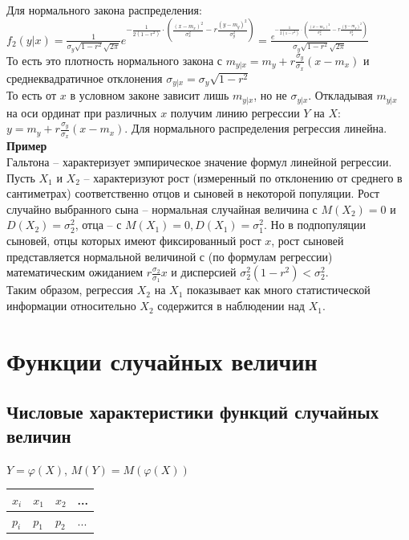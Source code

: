 \documentclass[russian, 12pt, fleqn,x11names]{article}
\begin{document}
\\
Для нормального закона распределения:\\
 $f_2(y|x) = \frac{1}{\sigma_y \sqrt{1 - r^2} \sqrt{2\pi}} \displaystyle{  e^{{-\frac{1}{2(1-r^2)}\cdot \left(\frac{(x-m_x)^2}{\sigma_x^2}  -r \frac{(y-m_y)^2}{\sigma_y^2}\right)}}  	}= \displaystyle{  \frac{  e^{{-\frac{1}{2(1-r^2)}\cdot \left (\frac{(x-m_x)^2}{\sigma_x^2}  -r \frac{(y-m_y)^2}{\sigma_y^2}\right )}} }{\sigma_y \sqrt{1 - r^2} \sqrt{2\pi}}}$\\
То есть это плотность нормального закона с $m_{y|x} = m_y + r \frac{\sigma_y}{\sigma_x} (x - m_x)$  и среднеквадратичное отклонения $\sigma_{y|x} = \sigma_{y} \sqrt{1-r^2}$ \\
То есть от $x$ в условном законе зависит лишь $m_{y|x}$, но не $\sigma_{y|x}$. Откладывая  $m_{y|x}$ на оси ординат при различных $x$ получим линию регрессии $Y$  на $X$: $y=m_y + r\frac{\sigma_y}{\sigma_x}(x-m_x)$. Для нормального распределения регрессия линейна.\\
\textbf{Пример}\\
Гальтона -- характеризует эмпирическое значение формул линейной регрессии. Пусть $X_1$ и $X_2$ -- характеризуют рост (измеренный по отклонению от среднего в сантиметрах) соответственно отцов и сыновей в некоторой популяции. Рост случайно выбранного сына -- нормальная случайная величина с $M(X_2) = 0$ и $D(X_2) = \sigma_2^2$,
отца -- с $M(X_1) = 0, D(X_1) = \sigma_1^2$. Но в подпопуляции сыновей, отцы которых имеют фиксированный рост $x$, рост сыновей представляется нормальной величиной с (по формулам регрессии) математическим ожиданием  $r\frac{\sigma_2}{\sigma_1} x$ и дисперсией $\sigma_2^2(1-r^2) < \sigma_2^2$.\\
Таким образом, регрессия $X_2$ на $X_1$ показывает как много статистической информации относительно $X_2$ содержится в наблюдении над $X_1$.\\
\newpage
\section{Функции случайных величин}
\subsection{Числовые характеристики функций случайных величин}
\noindent

$Y = \varphi(X)$, $M(Y) = M(\varphi(X))$\\

\begin{tabular}[b]{ | l | l |  l | l | }
\hline
$x_i$&$x_1$&$x_2$&...\\
\hline
$p_i$&$p_1$&$p_2$&...\\
\hline
\end{tabular}\\
\end{document}
